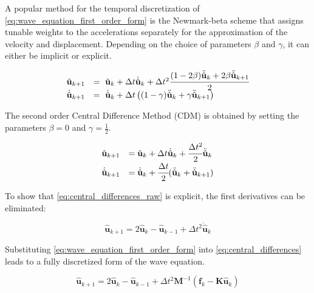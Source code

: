 A popular method for the temporal discretization of \ref{eq:wave_equation_first_order_form} is the Newmark-beta scheme \cite{Newmark1959} that assigns tunable weights to the accelerations separately for the approximation of the velocity and displacement. Depending on the choice of parameters $\beta$ and $\gamma$, it can either be implicit or explicit.

\begin{equation}
	\begin{array}{rl}
		\hat{\mathbf{u}}_{k+1} &= \ \hat{\mathbf{u}}_k + \Delta t \dot{\hat{\mathbf{u}}}_k + \Delta t^2
		\cfrac{(1-2 \beta) \ddot{\hat{\mathbf{u}}}_k + 2 \beta \ddot{\hat{\mathbf{u}}}_{k+1}}{2} \\
		\dot{\hat{\mathbf{u}}}_{k+1} &= \ \dot{\hat{\mathbf{u}}}_k + \Delta t \left(
		(1 - \gamma) \ddot{\hat{\mathbf{u}}}_k + \gamma \ddot{\hat{\mathbf{u}}}_{k+1}
		\right) \\
	\end{array}
\end{equation}

The second order Central Difference Method (CDM) is obtained by setting the parameters $\beta=0$ and $\gamma=\frac{1}{2}$.

\begin{equation} \label{eq:central_differences_raw}
	\begin{array}{rl}
		\hat{\mathbf u}_{k+1} &= \hat{\mathbf u}_k + \Delta t \dot{\hat{\mathbf u}}_k + \cfrac{\Delta t^2}{2} \ddot{\hat{\mathbf u}}_k \\
		\dot{\hat{\mathbf u}}_{k+1} &= \dot{\hat{\mathbf u}}_k + \cfrac{\Delta t}{2}( \ddot{\hat{\mathbf u}}_k + \ddot{\hat{\mathbf u}}_{k+1} ) \\
	\end{array}
\end{equation}

To show that \ref{eq:central_differences_raw} is explicit, the first derivatives can be eliminated:

\begin{equation} \label{eq:central_differences}
	\hat{\mathbf u}_{k+1} = 2\hat{\mathbf u}_k - \hat{\mathbf u}_{k-1} + \Delta t^2 \ddot{\hat{\mathbf u}}_k
\end{equation}

Substituting \ref{eq:wave_equation_first_order_form} into \ref{eq:central_differences} leads to a fully discretized form of the wave equation.

\begin{equation} \label{eq:wave_equation_fully_discretized}
	\hat{\mathbf u}_{k+1} = 2\hat{\mathbf u}_k - \hat{\mathbf u}_{k-1} + \Delta t^2 \mathbf M^{-1}(\mathbf f_k - \mathbf K \hat{\mathbf u}_k)
\end{equation}

